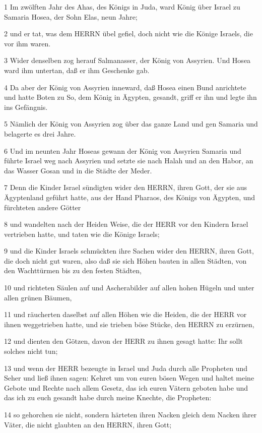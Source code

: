\par 1 Im zwölften Jahr des Ahas, des Königs in Juda, ward König über Israel zu Samaria Hosea, der Sohn Elas, neun Jahre;
\par 2 und er tat, was dem HERRN übel gefiel, doch nicht wie die Könige Israels, die vor ihm waren.
\par 3 Wider denselben zog herauf Salmanasser, der König von Assyrien. Und Hosea ward ihm untertan, daß er ihm Geschenke gab.
\par 4 Da aber der König von Assyrien inneward, daß Hosea einen Bund anrichtete und hatte Boten zu So, dem König in Ägypten, gesandt, griff er ihn und legte ihn ins Gefängnis.
\par 5 Nämlich der König von Assyrien zog über das ganze Land und gen Samaria und belagerte es drei Jahre.
\par 6 Und im neunten Jahr Hoseas gewann der König von Assyrien Samaria und führte Israel weg nach Assyrien und setzte sie nach Halah und an den Habor, an das Wasser Gosan und in die Städte der Meder.
\par 7 Denn die Kinder Israel sündigten wider den HERRN, ihren Gott, der sie aus Ägyptenland geführt hatte, aus der Hand Pharaos, des Königs von Ägypten, und fürchteten andere Götter
\par 8 und wandelten nach der Heiden Weise, die der HERR vor den Kindern Israel vertrieben hatte, und taten wie die Könige Israels;
\par 9 und die Kinder Israels schmückten ihre Sachen wider den HERRN, ihren Gott, die doch nicht gut waren, also daß sie sich Höhen bauten in allen Städten, von den Wachttürmen bis zu den festen Städten,
\par 10 und richteten Säulen auf und Ascherabilder auf allen hohen Hügeln und unter allen grünen Bäumen,
\par 11 und räucherten daselbst auf allen Höhen wie die Heiden, die der HERR vor ihnen weggetrieben hatte, und sie trieben böse Stücke, den HERRN zu erzürnen,
\par 12 und dienten den Götzen, davon der HERR zu ihnen gesagt hatte: Ihr sollt solches nicht tun;
\par 13 und wenn der HERR bezeugte in Israel und Juda durch alle Propheten und Seher und ließ ihnen sagen: Kehret um von euren bösen Wegen und haltet meine Gebote und Rechte nach allem Gesetz, das ich euren Vätern geboten habe und das ich zu euch gesandt habe durch meine Knechte, die Propheten:
\par 14 so gehorchen sie nicht, sondern härteten ihren Nacken gleich dem Nacken ihrer Väter, die nicht glaubten an den HERRN, ihren Gott;

